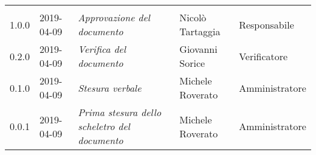\newpage 
\section*{}
	\begin{longtable}{C{2cm}|C{2.5cm}|C{4.5cm}|C{2.5cm}|C{3cm}}
	
	 &  &  &  &   \\
	\endhead
		
		1.0.0 & 2019-04-09 &  \emph{Approvazione del documento} & Nicolò Tartaggia & Responsabile\\
		\hline
		
		0.2.0 & 2019-04-09 & \emph{Verifica del documento} & Giovanni Sorice & Verificatore \\
		\hline
		
		0.1.0 & 2019-04-09 & \emph{Stesura verbale} & Michele Roverato & Amministratore \\
		\hline
		
		0.0.1 & 2019-04-09 & \emph{Prima stesura dello scheletro del documento} & Michele Roverato & Amministratore \\
		
\end{longtable}



\clearpage